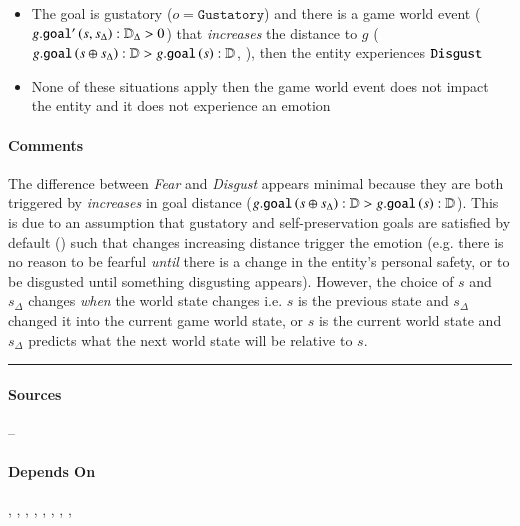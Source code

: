 \begin{itemize}
    \item The goal is gustatory ($o = \mathtt{Gustatory}$) and there is a
    game world event ($g.\mathtt{goal'}\left(s, s_\Delta\right) :
    \mathbb{D}_{\Delta} > 0$) that \textit{increases} the distance to $g$
    ($g.\mathtt{goal}\left(s \oplus s_\Delta\right) : \mathbb{D} >
    g.\mathtt{goal}\left(s\right) : \mathbb{D}$,
    ), then the entity experiences $\mathtt{Disgust}$

    \item None of these situations apply then the game world event does not
    impact the entity and it does not experience an emotion
\end{itemize}

\paragraph{Comments} The difference between \textit{Fear} and \textit{Disgust}
appears minimal because they are both triggered by \textit{increases} in goal
distance ($g.\mathtt{goal}\left(s \oplus s_\Delta\right) : \mathbb{D} >
g.\mathtt{goal}\left(s\right) : \mathbb{D}$). This is due to an
assumption that gustatory and self-preservation goals are satisfied by default
() such that changes increasing distance trigger the
emotion (e.g. there is no reason to be fearful \textit{until} there is a change
in the entity's personal safety, or to be disgusted until something disgusting
appears). However, the choice of $s$ and $s_\Delta$ changes \textit{when} the
world state changes i.e. $s$ is the previous state and $s_\Delta$ changed it
into the current game world state, or $s$ is the current world state and
$s_\Delta$ predicts what the next world state will be relative to $s$. \\\hrule

\paragraph{Sources} --

\paragraph{Depends On} , ,
, , ,
,
, , 

